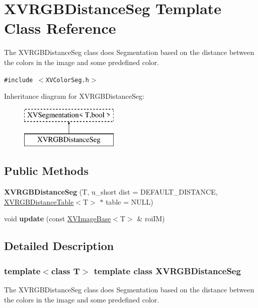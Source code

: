 \hypertarget{class_XVRGBDistanceSeg}{
\section{XVRGBDistance\-Seg  Template Class Reference}
\label{XVRGBDistanceSeg}
}
The XVRGBDistance\-Seg class does Segmentation based on the distance between the colors in the image and some predefined color. 


{\tt \#include $<$XVColor\-Seg.h$>$}

Inheritance diagram for XVRGBDistance\-Seg:\begin{figure}[H]
\begin{center}
\leavevmode
\includegraphics[height=2cm]{class_XVRGBDistanceSeg}
\end{center}
\end{figure}
\subsection*{Public Methods}
\begin{CompactItemize}
\item 
\label{XVRGBDistanceSeg_a0}
\hypertarget{class_XVRGBDistanceSeg_a0}{
{\bf XVRGBDistance\-Seg} (T, u\_\-short dist = DEFAULT\_\-DISTANCE, \hyperlink{class_XVRGBDistanceTable}{XVRGBDistance\-Table}$<$T$>$ $\ast$ table = NULL)}

\item 
void {\bf update} (const \hyperlink{class_XVImageBase}{XVImage\-Base}$<$T$>$ \& roi\-IM)
\end{CompactItemize}


\subsection{Detailed Description}
\subsubsection*{template$<$class T$>$  template class XVRGBDistance\-Seg}

The XVRGBDistance\-Seg class does Segmentation based on the distance between the colors in the image and some predefined color.





